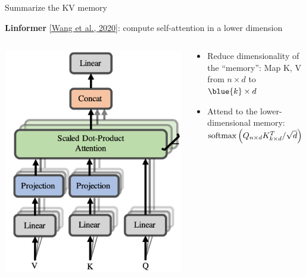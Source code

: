 \documentclass[usenames,dvipsnames,notes,11pt,aspectratio=169,hyperref={colorlinks=true, linkcolor=blue}]{beamer}
\begin{document}
\begin{frame}
    {Summarize the KV memory}

    \textbf{Linformer} \href{https://arxiv.org/pdf/2006.04768.pdf}{[Wang et al., 2020]}: compute self-attention in a lower dimension \\[1em]

    \begin{columns}
        \begin{column}{0.3\textwidth}
        {\includegraphics[width=\textwidth]{figures/linformer}}
        \end{column}
        \begin{column}{0.7\textwidth}
            \begin{itemize}[<+->]
                \item Reduce dimensionality of the ``memory'': Map K, V from $n\times d$ to $\blue{k}\times d$
                \item Attend to the lower-dimensional memory: $\mathrm{softmax}\left( Q_{n\times d}K^T_{k\times d}/\sqrt{d} \right)$
                    \begin{itemize}

\end{itemize}
\end{itemize}
\end{column}
\end{columns}
\end{frame}
\end{document}
